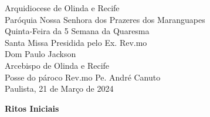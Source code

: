 \documentclass{book}
\begin{document}
\begin{center}
    \LARGE Arquidiocese de Olinda e Recife
    \vspace{.2cm} \\
    \Large Paróquia Nossa Senhora dos Prazeres dos Maranguapes
    \vspace{5cm} \\
    \textcolor{VioletRed2}{\huge Quinta-Feira da 5\textordfeminine{} Semana da Quaresma}
    \vspace{5cm} \\
    \Large Santa Missa Presidida pelo Ex. Rev.mo
    \vspace{.2cm} \\
    \textcolor{VioletRed2}{\huge Dom Paulo Jackson}
    \vspace{.2cm} \\
    \Large Arcebispo de Olinda e Recife
    \vspace{.5cm} \\
    \Large Posse do pároco Rev.mo Pe. André Canuto
    \vspace{.2cm}
    \vspace{\fill}\\
    \Large Paulista, 21 de Março de 2024
\end{center}
\cleardoublepage{}
\begin{center}
    \textbf{Ritos Iniciais}
\end{center}
\end{document}
